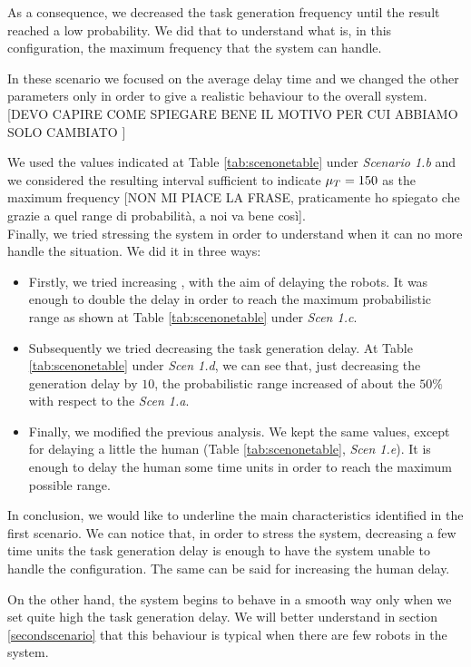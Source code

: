 As a consequence, we decreased the task generation frequency until the result reached a low probability. We did that to understand what is, in this configuration, the maximum frequency that the system can handle.

In these scenario we focused on the average delay time \mT \space and we changed the other parameters only in order to give a realistic behaviour to the overall system. [DEVO CAPIRE COME SPIEGARE BENE IL MOTIVO PER CUI ABBIAMO SOLO CAMBIATO \mT]

We used the values indicated at Table \ref{tab:scenonetable} under \emph{Scenario 1.b} and we considered the resulting interval sufficient to indicate $\mu_T = 150$ as the maximum frequency [NON MI PIACE LA FRASE, praticamente ho spiegato che grazie a quel range di probabilità, a noi va bene così].
\\

Finally, we tried stressing the system in order to understand when it can no more handle the situation. We did it in three ways:
\begin{itemize}
    \item Firstly, we tried increasing \K, with the aim of delaying the robots. It was enough to double the delay in order to reach the maximum probabilistic range as shown at Table \ref{tab:scenonetable} under \emph{Scen 1.c}.
    \item Subsequently we tried decreasing the task generation delay. At Table \ref{tab:scenonetable} under \emph{Scen 1.d}, we can see that, just decreasing the generation delay by $10$, the probabilistic range increased of about the $50\%$ with respect to the \emph{Scen 1.a}.
    \item Finally, we modified the previous analysis. We kept the same values, except for delaying a little the human (Table \ref{tab:scenonetable}, \emph{Scen 1.e}). It is enough to delay the human some time units in order to reach the maximum possible range.
\end{itemize}

In conclusion, we would like to underline the main characteristics identified in the first scenario. We can notice that, in order to stress the system, decreasing a few time units the task generation delay is enough to have the system unable to handle the configuration. The same can be said for increasing the human delay.

On the other hand, the system begins to behave in a smooth way only when we set quite high the task generation delay. We will better understand in section \ref{secondscenario} that this behaviour is typical when there are few robots in the system.

